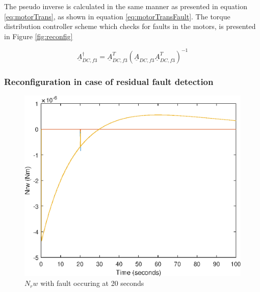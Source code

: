 
The pseudo inverse is calculated in the same manner as presented in equation \ref{eq:motorTrans}, as shown in equation \ref{eq:motorTransFault}. The torque distribution controller scheme which checks for faults in the motors, is presented in Figure \ref{fig:reconfig}

\begin{equation}
\label{eq:motorTransFault}
\underline{A}_{DC,f3}^\dagger   = \underline{A}_{DC,f3}^T  (\underline{A}_{DC,f3} \underline{A}_{DC,f3}^T)^{-1}
\end{equation}
%

\subsubsection{Reconfiguration in case of residual fault detection}

\begin{figure}
	\centering
	\includegraphics[width=120mm]{figures/3dTorque_resid_reconfig}
	\caption{$N_rw$ with fault occuring at 20 seconds}
\end{figure} 

